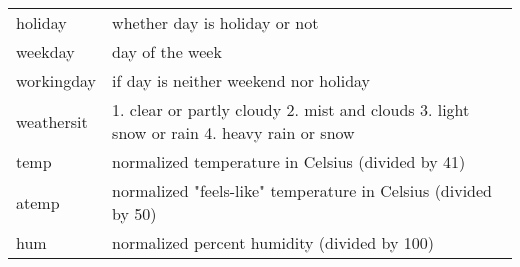 \documentclass[11pt]{article}
\begin{document}
\begin{longtable}[]{@{}ll@{}}
\begin{minipage}[t]{0.17\columnwidth}
holiday\strut
\end{minipage} & \begin{minipage}[t]{0.77\columnwidth}\raggedright\strut
whether day is holiday or not\strut
\end{minipage}\tabularnewline
\begin{minipage}[t]{0.17\columnwidth}\raggedright\strut
weekday\strut
\end{minipage} & \begin{minipage}[t]{0.77\columnwidth}\raggedright\strut
day of the week\strut
\end{minipage}\tabularnewline
\begin{minipage}[t]{0.17\columnwidth}\raggedright\strut
workingday\strut
\end{minipage} & \begin{minipage}[t]{0.77\columnwidth}\raggedright\strut
if day is neither weekend nor holiday\strut
\end{minipage}\tabularnewline
\begin{minipage}[t]{0.17\columnwidth}\raggedright\strut
weathersit\strut
\end{minipage} & \begin{minipage}[t]{0.77\columnwidth}\raggedright\strut
1. clear or partly cloudy 2. mist and clouds 3. light snow or rain 4.
heavy rain or snow\strut
\end{minipage}\tabularnewline
\begin{minipage}[t]{0.17\columnwidth}\raggedright\strut
temp\strut
\end{minipage} & \begin{minipage}[t]{0.77\columnwidth}\raggedright\strut
normalized temperature in Celsius (divided by 41)\strut
\end{minipage}\tabularnewline
\begin{minipage}[t]{0.17\columnwidth}\raggedright\strut
atemp\strut
\end{minipage} & \begin{minipage}[t]{0.77\columnwidth}\raggedright\strut
normalized "feels-like" temperature in Celsius (divided by 50)\strut
\end{minipage}\tabularnewline
\begin{minipage}[t]{0.17\columnwidth}\raggedright\strut
hum\strut
\end{minipage} & \begin{minipage}[t]{0.77\columnwidth}\raggedright\strut
normalized percent humidity (divided by 100)\strut
\end{minipage}\tabularnewline

\end{longtable}
\end{document}
